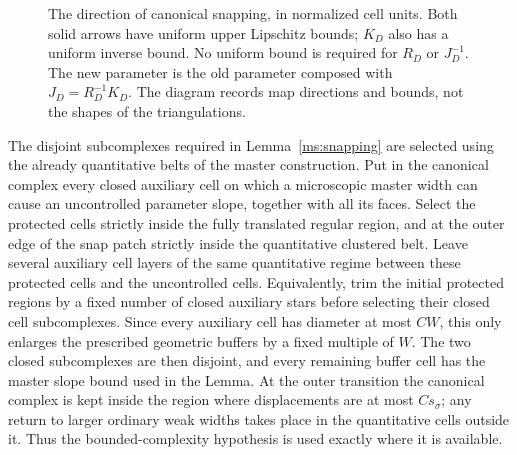 \documentclass[11pt]{article}
\numberwithin{equation}{section}
\theoremstyle{definition}
\theoremstyle{remark}
\begin{document}
\begin{figure}[htbp]
\centering
{}
\caption{The direction of canonical snapping, in normalized cell units.
Both solid arrows have uniform upper Lipschitz bounds; $K_D$ also has
a uniform inverse bound.  No uniform bound is required for
$R_D$ or $J_D^{-1}$.  The new parameter is the old parameter composed
with $J_D=R_D^{-1}K_D$.  The diagram records map directions and bounds,
not the shapes of the triangulations.}
\label{ms:fig-snapping}
\end{figure}

The disjoint subcomplexes required in
Lemma~\ref{ms:snapping} are selected using the already quantitative
belts of the master construction.  Put in the canonical complex
every closed auxiliary cell on which a microscopic master width
can cause an uncontrolled parameter slope, together with all its
faces.  Select the protected cells strictly inside the fully
translated regular region, and at the outer edge of the snap patch
strictly inside the quantitative clustered belt.  Leave several
auxiliary cell layers of the same quantitative regime between
these protected cells and the uncontrolled cells.  Equivalently,
trim the initial protected regions by a fixed number of closed
auxiliary stars before selecting their closed cell subcomplexes.
Since every auxiliary cell has diameter at most $C W$, this only
enlarges the prescribed geometric buffers by a fixed multiple of
$W$.  The two closed subcomplexes are then disjoint, and every
remaining buffer cell has the master slope bound used in the
Lemma.  At the outer transition the canonical complex is kept
inside the region where displacements are at most $C s_\sigma$;
any return to larger ordinary weak widths takes place in the
quantitative cells outside it.  Thus the bounded-complexity
hypothesis is used exactly where it is available.
\end{document}
